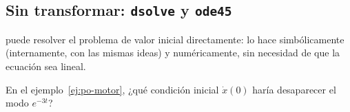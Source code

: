 \subsection{Sin transformar: \texttt{dsolve} y \texttt{ode45}}
\matlab puede resolver el problema de valor inicial directamente:  lo hace simbólicamente (internamente, con las mismas ideas) y  numéricamente, sin necesidad de que la ecuación sea lineal.

\begin{pausa}
En el ejemplo~\ref{ej:po-motor}, ¿qué condición inicial $\dot x(0)$ haría desaparecer el modo $e^{-3t}$?
\end{pausa}
